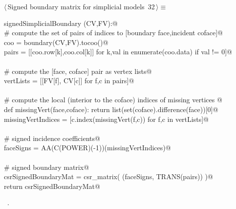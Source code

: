 \documentclass[11pt,oneside]{article}	%
\begin{document}
\begin{flushleft} \small \label{scrap52}
\protect{}$\langle\,$Signed boundary matrix for simplicial models\nobreak\ {\footnotesize 32}$\,\rangle\equiv$
\vspace{-1ex}
\begin{list}{}{} \item
\mbox{}\verb@def signedSimplicialBoundary (CV,FV):@\\
\mbox{}\verb@   # compute the set of pairs of indices to [boundary face,incident coface]@\\
\mbox{}\verb@   coo = boundary(CV,FV).tocoo()@\\
\mbox{}\verb@   pairs = [[coo.row[k],coo.col[k]] for k,val in enumerate(coo.data) if val != 0]@\\
\mbox{}\verb@@\\
\mbox{}\verb@   # compute the [face, coface] pair as vertex lists@\\
\mbox{}\verb@   vertLists = [[FV[f], CV[c]] for f,c in pairs]@\\
\mbox{}\verb@@\\
\mbox{}\verb@   # compute the local (interior to the coface) indices of missing vertices @\\
\mbox{}\verb@   def missingVert(face,coface): return list(set(coface).difference(face))[0]@\\
\mbox{}\verb@   missingVertIndices = [c.index(missingVert(f,c)) for f,c in vertLists]@\\
\mbox{}\verb@@\\
\mbox{}\verb@   # signed incidence coefficients@\\
\mbox{}\verb@   faceSigns = AA(C(POWER)(-1))(missingVertIndices)@\\
\mbox{}\verb@@\\
\mbox{}\verb@   # signed boundary matrix@\\
\mbox{}\verb@   csrSignedBoundaryMat = csr_matrix( (faceSigns, TRANS(pairs)) )@\\
\mbox{}\verb@   return csrSignedBoundaryMat@\\
\mbox{}\verb@@{\NWsep}
\end{list}
\vspace{-1ex}
\footnotesize\addtolength{\baselineskip}{-1ex}
\begin{list}{}{\setlength{\itemsep}{-\parsep}\setlength{\itemindent}{-\leftmargin}}
\item \NWtxtMacroRefIn\ .
\end{list}
\end{flushleft}
\end{document}
